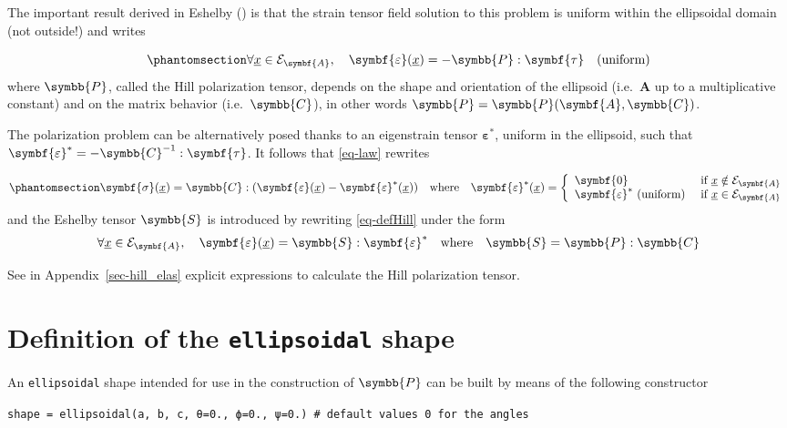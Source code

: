 \documentclass[
  a4paper,
  numbers=noendperiod,
  DIV=12]{scrreprt}
\newcommand{\uu}[1]{{\symbf{{#1}}}}
\newcommand{\uuuu}[1]{{\symbb{{#1}}}}
\newcommand{\uv}[1]{{\underline{{#1}}}}
\newcommand{\x}{{\uv{{x}}}}
\newcommand{\eps}{{\uu{{\varepsilon}}}}
\newcommand{\sig}{{\uu{{\sigma}}}}
\begin{document}
The important result derived in Eshelby
() is that the strain tensor field
solution to this problem is uniform within the ellipsoidal domain (not
outside!) and writes

\begin{equation}\phantomsection\label{eq-defHill}{
   \forall \x \in \mathcal{E}_{\uu{A}},\quad \eps(\x)=-\uuuu{P}:\uu{\tau}\quad\textrm{(uniform)}
}\end{equation} where \(\uuuu{P}\), called the Hill polarization tensor,
depends on the shape and orientation of the ellipsoid (i.e.~\(\uu{A}\)
up to a multiplicative constant) and on the matrix behavior
(i.e.~\(\uuuu{C}\)), in other words
\(\uuuu{P}=\uuuu{P}(\uu{A},\uuuu{C})\).

The polarization problem can be alternatively posed thanks to an
eigenstrain tensor \(\eps^*\), uniform in the ellipsoid, such that
\(\eps^*=-\uuuu{C}^{-1}:\uu{\tau}\). It follows that \ref{eq-law}
rewrites

\begin{equation}\phantomsection\label{eq-law2}{
    \sig(\x)=\uuuu{C}:(\eps(\x)-\eps^*(\x))\quad\textrm{where}\quad
    \eps^*(\x)=
    \left\{
    \begin{array}{ll}
    \uu{0}&\textrm{ if }\x \notin \mathcal{E}_{\uu{A}}\\
    \eps^*\textrm{ (uniform)}&\textrm{ if }\x \in \mathcal{E}_{\uu{A}}
    \end{array}
    \right.
}\end{equation} and the Eshelby tensor \(\uuuu{S}\) is introduced by
rewriting \ref{eq-defHill} under the form \[
   \forall \x \in \mathcal{E}_{\uu{A}},\quad \eps(\x)=\uuuu{S}:\eps^*\quad\textrm{where}\quad\uuuu{S}=\uuuu{P}:\uuuu{C}
\]

See in Appendix~\ref{sec-hill_elas} explicit expressions to calculate
the Hill polarization tensor.

\section{\texorpdfstring{Definition of the \texttt{ellipsoidal}
shape}{Definition of the ellipsoidal shape}}\label{definition-of-the-ellipsoidal-shape}

An \texttt{ellipsoidal} shape intended for use in the construction of
\(\uuuu{P}\) can be built by means of the following constructor

\texttt{shape\ =\ ellipsoidal(a,\ b,\ c,\ θ=0.,\ ϕ=0.,\ ψ=0.)\ \#\ default\ values\ 0\ for\ the\ angles}
\end{document}
